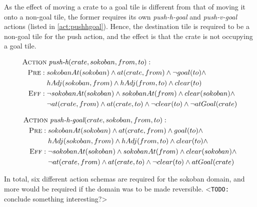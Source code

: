 \documentclass[../Master.tex]{subfiles}
\begin{document}
As the effect of moving a crate to a goal tile is different from that of moving it onto a non-goal tile, the former requires its own \textit{push-h-goal}  and \textit{push-v-goal} actions (listed in \eqref{act:pushhgoal}). Hence, the destination tile is required to be a non-goal tile for the push action, and the effect is that the crate is not occupying a goal tile.

\begin{align}
\begin{split} \label{act:pushh}
    \textsc{Action} &\; \textit{push-h}(crate, sokoban, from, to): \\
    \textsc{Pre}: \; & sokobanAt(sokoban) \land
                       at(crate, from) \land
                       \neg goal(to) \land \\
                     & hAdj(sokoban, from) \land
                       hAdj(from, to) \land
                       clear(to)
                       \\
    \textsc{Eff}: \; & \neg sokobanAt(sokoban) \land
                       sokobanAt(from) \land
                       clear(sokoban) \land \\
                     & \neg at(crate, from) \land
                       at(crate, to) \land
                       \neg clear(to) \land
                       \neg atGoal(crate)
\end{split}
\end{align}

\begin{align}
\begin{split} \label{act:pushhgoal}
    \textsc{Action} &\; \textit{push-h-goal}(crate, sokoban, from, to): \\
    \textsc{Pre}: \; & sokobanAt(sokoban) \land
                       at(crate, from) \land
                       goal(to) \land \\
                     & hAdj(sokoban, from) \land
                       hAdj(from, to) \land
                       clear(to) \land
                       \\
    \textsc{Eff}: \; & \neg sokobanAt(sokoban) \land
                       sokobanAt(from) \land
                       clear(sokoban) \land \\
                     & \neg at(crate, from) \land
                       at(crate, to) \land
                       \neg clear(to) \land
                       atGoal(crate)
\end{split}
\end{align}

In total, six different action schemas are required for the sokoban domain, and more would be required if the domain was to be made reversible. <\texttt{TODO:} conclude something interesting?>
\end{document}
